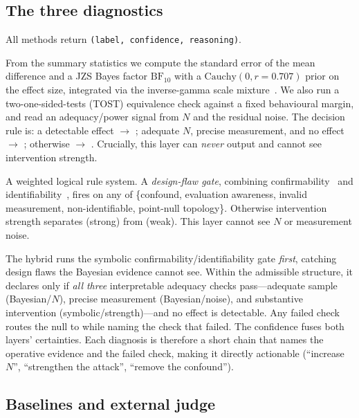\subsection{The three diagnostics}

All methods return \texttt{(label, confidence, reasoning)}.

 From the summary statistics we
compute the standard error of the mean difference and a JZS Bayes factor
$\mathrm{BF}_{10}$ with a $\mathrm{Cauchy}(0, r{=}0.707)$ prior on the effect size,
integrated via the inverse-gamma scale mixture~\citep{rouder2009bayesian}. We also
run a two-one-sided-tests (TOST) equivalence check against a fixed behavioural
margin, and read an adequacy/power signal from $N$ and the residual noise. The
decision rule is: a detectable effect $\rightarrow$ \WI; adequate $N$, precise
measurement, and no effect $\rightarrow$ \GR; otherwise $\rightarrow$ \WI.
Crucially, this layer can \emph{never} output \DF and cannot see intervention
strength.

 A weighted logical rule system.
A \emph{design-flaw gate}, combining confirmability~\citep{dale2024confirming} and
identifiability~\citep{santosgrueiro2026limits}, fires \DF on any of
\{confound, evaluation awareness, invalid measurement, non-identifiable,
point-null topology\}. Otherwise intervention strength separates \GR (strong) from
\WI (weak). This layer cannot see $N$ or measurement noise.

 The hybrid runs the symbolic confirmability/identifiability
gate \emph{first}, catching design flaws the Bayesian evidence cannot see. Within
the admissible structure, it declares \GR only if \emph{all three} interpretable
adequacy checks pass---adequate sample (Bayesian/$N$), precise measurement
(Bayesian/noise), and substantive intervention (symbolic/strength)---and no effect
is detectable. Any failed check routes the null to \WI while naming the check that
failed. The confidence fuses both layers' certainties. Each diagnosis is therefore
a short chain that names the operative evidence and the failed check, making it
directly actionable (\eg ``increase $N$'', ``strengthen the attack'', ``remove the
confound'').

\subsection{Baselines and external judge}

